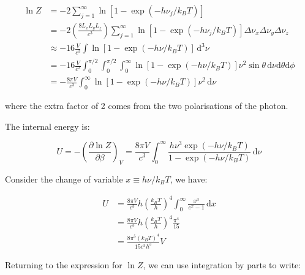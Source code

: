 \documentclass[12pt]{article}
\begin{document}
\begin{equation}
    \begin{split}
        \ln{Z} &= -2 \sum_{j = 1}^{\infty} \ln{\left[ 1 - \exp\left( -h \nu_{j}/k_{B}T \right) \right]} \\
        &= -2 \left( \frac{8L_{x}L_{y}L_{z}}{c^{3}} \right) \sum_{j = 1}^{\infty} \ln{\left[ 1 - \exp\left( -h \nu_{j}/k_{B}T \right) \right]} \Delta \nu_{x} \Delta \nu_{y} \Delta \nu_{z} \\
        &\approx -16\frac{V}{c^{3}} \int \ln{\left[ 1 - \exp\left( -h \nu/k_{B}T \right) \right]} \, \mathrm{d}^{3}\nu \\
        &= -16\frac{V}{c^{3}} \int_{0}^{\pi/2} \int_{0}^{\pi/2} \int_{0}^{\infty} \ln{\left[ 1 - \exp\left( -h \nu/k_{B}T \right) \right]} \nu^{2} \sin{\theta} \, \mathrm{d}\nu \mathrm{d}\theta \mathrm{d}\phi \\
        &= -\frac{8\pi V}{c^{3}} \int_{0}^{\infty} \ln{\left[ 1 - \exp\left( -h \nu/k_{B}T \right) \right]} \nu^{2} \, \mathrm{d}\nu
    \end{split}
\end{equation}

where the extra factor of 2 comes from the two polarisations of the photon.

The internal energy is:

\begin{equation}
    U = -\left( \frac{\partial \ln{Z}}{\partial \beta} \right)_{V} = \frac{8\pi V}{c^{3}} \int_{0}^{\infty} \frac{h \nu^{3} \exp\left( -h \nu/k_{B}T \right)}{1 - \exp\left( -h \nu/k_{B}T \right)} \, \mathrm{d}\nu
\end{equation}

Consider the change of variable $x \equiv h\nu/k_{B}T$, we have:

\begin{equation}
    \begin{split}
        U &= \frac{8\pi V}{c^{3}} h \left( \frac{k_{B}T}{h} \right)^{4} \int_{0}^{\infty} \frac{x^{3}}{e^{x} - 1} \, \mathrm{d}x \\
        &= \frac{8\pi V}{c^{3}} h \left( \frac{k_{B}T}{h} \right)^{4} \frac{\pi^{4}}{15} \\
        &= \frac{8\pi^{5} (k_{B}T)^{4}}{15c^{3} h^{3}} V
    \end{split}
\end{equation}

Returning to the expression for $\ln{Z}$, we can use integration by parts to write:
\end{document}
